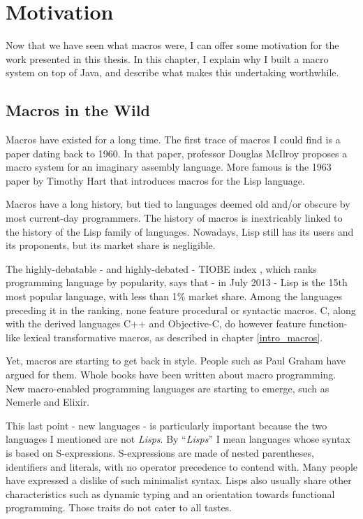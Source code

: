 \chapter{Motivation}
\label{motivation_chapter}

Now that we have seen what macros were, I can offer some motivation for the work
presented in this thesis. In this chapter, I explain why I built a macro system
on top of Java, and describe what makes this undertaking worthwhile.

\section{Macros in the Wild}

Macros have existed for a long time. The first trace of macros I could find is a
paper dating back to 1960. \cite{macro_assem} In that paper, professor Douglas
McIlroy proposes a macro system for an imaginary assembly language. More famous
is the 1963 paper by Timothy Hart \cite{macrodef} that introduces macros for the
Lisp language.

Macros have a long history, but tied to languages deemed old and/or obscure by
most current-day programmers. The history of macros is inextricably linked to
the history of the Lisp family of languages. Nowadays, Lisp still has its users
and its proponents, but its market share is negligible.

The highly-debatable - and highly-debated - TIOBE index \cite{tiobe}, which
ranks programming language by popularity, says that - in July 2013 - Lisp is the
15th most popular language, with less than 1\% market share. Among the languages
preceding it in the ranking, none feature procedural or syntactic macros. C,
along with the derived languages C++ and Objective-C, do however feature
function-like lexical transformative macros, as described in chapter
\ref{intro_macros}.

Yet, macros are starting to get back in style. People such as Paul Graham have
argued for them. Whole books \cite{on_lisp} \cite{let_over_lambda} have been
written about macro programming. New macro-enabled programming languages are
starting to emerge, such as Nemerle \cite{nemerle_paper} and Elixir.
\cite{elixir_macros}

This last point - new languages - is particularly important because the two
languages I mentioned are not \emph{Lisps}. By ``\emph{Lisps}'' I mean languages
whose syntax is based on S-expressions. S-expressions are made of nested
parentheses, identifiers and literals, with no operator precedence to contend
with. Many people have expressed a dislike of such minimalist syntax. Lisps also
usually share other characteristics such as dynamic typing and an orientation
towards functional programming. Those traits do not cater to all tastes.

